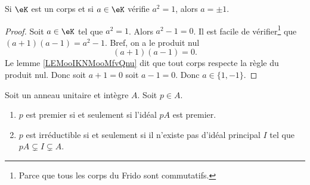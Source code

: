 \begin{lemma}       \label{LEMooJNIBooAURhrt}
	Si \( \eK\) est un corps et si \( a\in \eK\) vérifie \( a^2=1\), alors \( a=\pm 1\).
\end{lemma}

\begin{proof}
	Soit \( a\in \eK\) tel que \( a^2=1\). Alors \( a^2-1=0\). Il est facile de vérifier\footnote{Parce que tous les corps du Frido sont commutatifs.} que \( (a+1)(a-1)=a^2-1\). Bref, on a le produit nul
	\begin{equation}
		(a+1)(a-1)=0.
	\end{equation}
	Le lemme \ref{LEMooIKNMooMfvQnu} dit que tout corps respecte la règle du produit nul. Donc soit \( a+1=0\) soit \( a-1=0\). Donc \( a\in\{ 1,-1 \}\).
\end{proof}


\begin{proposition}		\label{PROPooZBTIooRhAhvg}
	Soit un anneau unitaire et intègre \( A\). Soit \( p\in A\).
	\begin{enumerate}
		\item		\label{ITEMooJWRYooHndNpV}
		      \( p\) est premier si et seulement si l'idéal \( pA\) est premier.
		\item		\label{ITEMooGHGCooRkJilg}
		      \( p\) est irréductible si et seulement si il n'existe pas d'idéal principal \( I\) tel que \( pA\subsetneq I\subsetneq A\).
	\end{enumerate}
\end{proposition}

